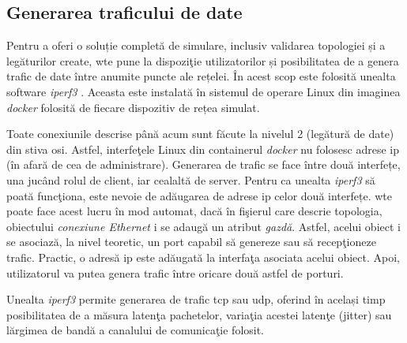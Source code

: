 \subsection{Generarea traficului de date}

Pentru a oferi o soluție completă de simulare, inclusiv validarea topologiei și a legăturilor create, \gls{wte} pune la dispoziţie utilizatorilor și posibilitatea de a genera trafic de date între anumite puncte ale rețelei. În acest scop este folosită unealta software \textit{iperf3} \cite{iperf32017, tirumala2005iperf}. Aceasta este instalată în sistemul de operare Linux din imaginea \textit{docker} folosită de fiecare dispozitiv de rețea simulat.

Toate conexiunile descrise până acum sunt făcute la nivelul 2 (legătură de date) din stiva \gls{osi}. Astfel, interfeţele Linux din containerul \textit{docker} nu folosesc adrese \gls{ip} (în afară de cea de administrare). Generarea de trafic se face între două interfețe, una jucând rolul de client, iar cealaltă de server. Pentru ca unealta \textit{iperf3} să poată funcţiona, este nevoie de adăugarea de adrese \gls{ip} celor două interfețe. \gls{wte} poate face acest lucru în mod automat, dacă în fişierul care descrie topologia, obiectului \textit{conexiune Ethernet} i se adaugă un atribut \textit{gazdă}. Astfel, acelui obiect i se asociază, la nivel teoretic, un port capabil să genereze sau să recepţioneze trafic. Practic, o adresă \gls{ip} este adăugată la interfaţa asociata acelui obiect. Apoi, utilizatorul va putea genera trafic între oricare două astfel de porturi. 

Unealta \textit{iperf3} permite generarea de trafic \gls{tcp} sau \gls{udp}, oferind în același timp posibilitatea de a măsura latenţa pachetelor, variaţia acestei latenţe (jitter) sau lărgimea de bandă a canalului de comunicaţie folosit.